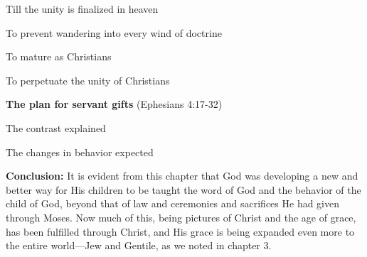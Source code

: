 \begin{compactenum}[I.]
\begin{compactenum}[A.]
    	\begin{compactenum}[1.]
    		\item Till the unity is finalized in heaven
    		\item To prevent wandering into every wind of doctrine
    		\item To mature as Christians
    		\item To perpetuate the unity of Christians
    	\end{compactenum}
    \end{compactenum}
    \item \textbf{The plan for servant gifts}  (Ephesians 4:17-32) 
    \begin{compactenum}[A.]
    	\item The contrast explained
    	\item The changes in behavior expected
    \end{compactenum}
\end{compactenum}
\textbf{Conclusion:} It is evident from this chapter that God was developing a new and better way for His children to be taught the word of God and the behavior of the child of God, beyond that of law and ceremonies and sacrifices He had given through Moses. Now much of this, being pictures of Christ and the age of grace, has been fulfilled through Christ, and His grace is being expanded even more to the entire world—Jew and Gentile, as we noted in chapter 3.
